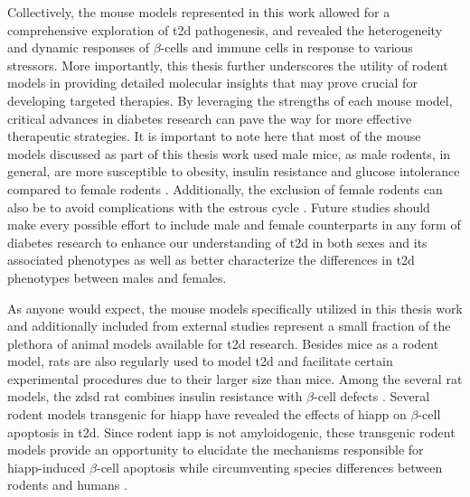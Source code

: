 \par Collectively, the mouse models represented in this work allowed for a comprehensive exploration of \gls{t2d} pathogenesis, and revealed the heterogeneity and dynamic responses of $\beta$-cells and immune cells in response to various stressors. More importantly, this thesis further underscores the utility of rodent models in providing detailed molecular insights that may prove crucial for developing targeted therapies. By leveraging the strengths of each mouse model, critical advances in diabetes research can pave the way for more effective therapeutic strategies. It is important to note here that most of the mouse models discussed as part of this thesis work used male mice, as male rodents, in general, are more susceptible to obesity, insulin resistance and glucose intolerance compared to female rodents \textbf{\cite{lutz_mammalian_2023}}. Additionally, the exclusion of female rodents can also be to avoid complications with the estrous cycle \textbf{\cite{stott_high_2020}}. Future studies should make every possible effort to include male and female counterparts in any form of diabetes research to enhance our understanding of \gls{t2d} in both sexes and its associated phenotypes as well as better characterize the differences in \gls{t2d} phenotypes between males and females.\\

\par As anyone would expect, the mouse models specifically utilized in this thesis work and additionally included from external studies represent a small fraction of the plethora of animal models available for \gls{t2d} research. Besides mice as a rodent model, rats are also regularly used to model \gls{t2d} and facilitate certain experimental procedures due to their larger size than mice. Among the several rat models, the \gls{zdsd} rat combines insulin resistance with $\beta$-cell defects \textbf{\cite{peterson_characterization_2015,lutz_mammalian_2023}}. Several rodent models transgenic for \gls{hiapp} have revealed the effects of \gls{hiapp} on $\beta$-cell apoptosis in \gls{t2d}. Since rodent \gls{iapp} is not amyloidogenic, these transgenic rodent models provide an opportunity to elucidate the mechanisms responsible for \gls{hiapp}-induced $\beta$-cell apoptosis while circumventing species differences between rodents and humans \textbf{\cite{matveyenko_islet_2006,hoppener_human_2008}}.\\


